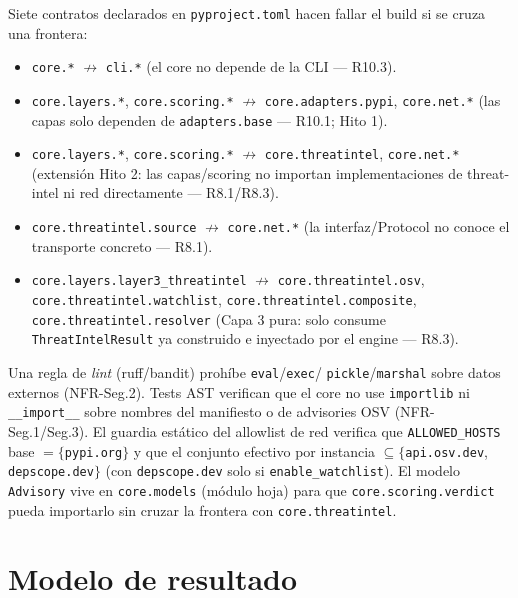 \documentclass[11pt,a4paper]{article}
\begin{document}
Siete contratos declarados en \texttt{pyproject.toml} hacen fallar el build si se
cruza una frontera:
\begin{itemize}[nosep]
  \item \texttt{core.*} \;$\not\rightarrow$\; \texttt{cli.*} (el core no depende
  de la CLI --- R10.3).
  \item \texttt{core.layers.*}, \texttt{core.scoring.*} \;$\not\rightarrow$\;
  \texttt{core.adapters.pypi}, \texttt{core.net.*} (las capas solo dependen de
  \texttt{adapters.base} --- R10.1; Hito 1).
  \item \texttt{core.layers.*}, \texttt{core.scoring.*} \;$\not\rightarrow$\;
  \texttt{core.threatintel}, \texttt{core.net.*} (extensión Hito 2: las capas/scoring
  no importan implementaciones de threat-intel ni red directamente --- R8.1/R8.3).
  \item \texttt{core.threatintel.source} \;$\not\rightarrow$\; \texttt{core.net.*}
  (la interfaz/Protocol no conoce el transporte concreto --- R8.1).
  \item \texttt{core.layers.layer3\_threatintel} \;$\not\rightarrow$\;
  \texttt{core.threatintel.osv}, \texttt{core.threatintel.watchlist},
  \texttt{core.threatintel.composite}, \texttt{core.threatintel.resolver}
  (Capa 3 pura: solo consume \texttt{ThreatIntelResult} ya construido e inyectado
  por el engine --- R8.3).
\end{itemize}
Una regla de \emph{lint} (ruff/bandit) prohíbe \texttt{eval}/\texttt{exec}/
\texttt{pickle}/\texttt{marshal} sobre datos externos (NFR-Seg.2). Tests AST
verifican que el core no use \texttt{importlib} ni \texttt{__import__} sobre
nombres del manifiesto o de advisories OSV (NFR-Seg.1/Seg.3). El guardia estático
del allowlist de red verifica que \texttt{ALLOWED\_HOSTS} base $=\{$\texttt{pypi.org}$\}$
y que el conjunto efectivo por instancia $\subseteq \{$\texttt{api.osv.dev},
\texttt{depscope.dev}$\}$ (con \texttt{depscope.dev} solo si \texttt{enable\_watchlist}).
El modelo \texttt{Advisory} vive en \texttt{core.models} (módulo hoja) para que
\texttt{core.scoring.verdict} pueda importarlo sin cruzar la frontera con
\texttt{core.threatintel}.

\section{Modelo de resultado}
\end{document}
